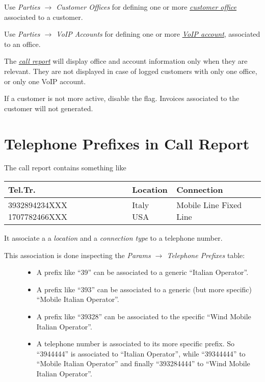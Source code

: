 \documentclass[letterpaper,10pt,english]{sphinxmanual}
\begin{document}
Use \emph{Parties \(\rightarrow\) Customer Offices} for defining one or more  {\hyperref[index:term-customer-office]{\emph{customer office}}} associated to a customer.

Use \emph{Parties \(\rightarrow\) VoIP Accounts} for defining one or more  {\hyperref[index:term-voip-account]{\emph{VoIP account}}}, associated to an office.

The {\hyperref[index:term-call-report]{\emph{call report}}} will display office and account information only when they are relevant. They are not displayed in case of logged customers with only one office, or only one VoIP account.

If a customer is not more active, disable the  flag. Invoices associated to the customer will not generated.


\section{Telephone Prefixes in Call Report}
\label{index:telephone-prefixes-in-call-report}\label{index:telephone-prefixes}
The call report contains something like

\begin{tabulary}{\linewidth}{|L|L|L|}
\hline
\textbf{
Tel.Tr.
} & \textbf{
Location
} & \textbf{
Connection
}\\
\hline

3932894234XXX
1707782466XXX
 & 
Italy
USA
 & 
Mobile Line
Fixed Line
\\
\hline
\end{tabulary}


It associate a a \emph{location} and a \emph{connection type} to a telephone number.
\begin{description}
\item[{This association is done inspecting the \emph{Params \(\rightarrow\) Telephone Prefixes} table:}] \leavevmode\begin{itemize}
\item {} 
A prefix like ``39'' can be associated to a generic ``Italian Operator''.

\item {} 
A prefix like ``393'' can be associated to a generic (but more specific) ``Mobile Italian Operator''.

\item {} 
A prefix like ``39328'' can be associated to the specific ``Wind Mobile Italian Operator''.

\item {} 
A telephone number is associated to its more specific prefix. So ``3944444'' is associated to ``Italian Operator'', while ``39344444'' to ``Mobile Italian Operator'' and finally ``393284444'' to ``Wind Mobile Italian Operator''.

\end{itemize}

\end{description}
\end{document}
